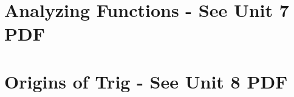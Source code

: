 \documentclass[handout]{xourse}
\begin{document}
\part{Analyzing Functions - See Unit 7 PDF}
%
%




%

\part{Origins of Trig - See Unit 8 PDF} 

%
%
%




%
%
%
\end{document}
